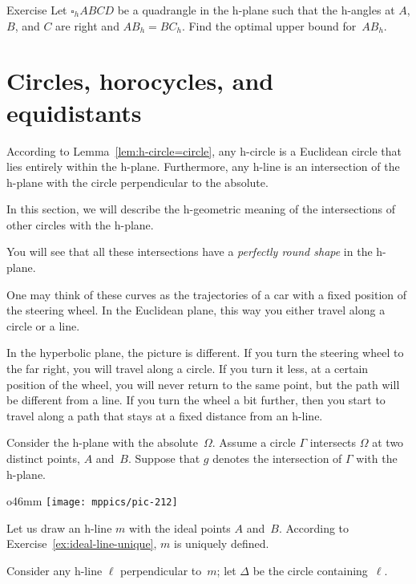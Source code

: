 \begin{thm}{Exercise}\label{ex:side-sup}
Let $\square_h ABCD$ be a quadrangle in the h-plane 
such that the h-angles at $A$, $B$, and $C$ are right and $AB_h=BC_h$.
Find the optimal upper bound for~$AB_h$.
\end{thm}


\section{Circles, horocycles, and equidistants}

According to Lemma~\ref{lem:h-circle=circle},
any h-circle is a Euclidean circle that lies entirely within the h-plane.
Furthermore, any h-line is an intersection of the h-plane with the circle 
perpendicular to the absolute.

In this section, we will describe the 
h-geometric meaning of the intersections 
of other circles with the h-plane.

You will see that all these intersections have a {}\emph{perfectly round shape} in the h-plane.

One may think of these curves as the trajectories of a car with a fixed position of the steering wheel.
In the Euclidean plane, 
this way you either travel along a circle or a line.

In the hyperbolic plane, the picture is different.
If you turn the steering wheel to the far right, you will travel along a circle.
If you turn it less, at a certain position of the wheel, you will never return to the same point, but the path will be different from a line.
If you turn the wheel a bit further, then you start to travel along a path that stays at a fixed distance from an h-line.

Consider the h-plane with the absolute~$\Omega$.
Assume a circle $\Gamma$ intersects $\Omega$ at two distinct points, $A$ and~$B$. 
Suppose that $g$ denotes the intersection of $\Gamma$ with the h-plane.

\begin{wrapfigure}{o}{46mm}
\vskip-0mm
\centering
\texttt{[image: mppics/pic-212]}
\end{wrapfigure}

Let us draw an h-line $m$ with the ideal points $A$ and~$B$.
According to Exercise~\ref{ex:ideal-line-unique}, $m$ is uniquely defined.

Consider any h-line $\ell$ perpendicular to~$m$;
let $\Delta$ be the circle containing~$\ell$.

